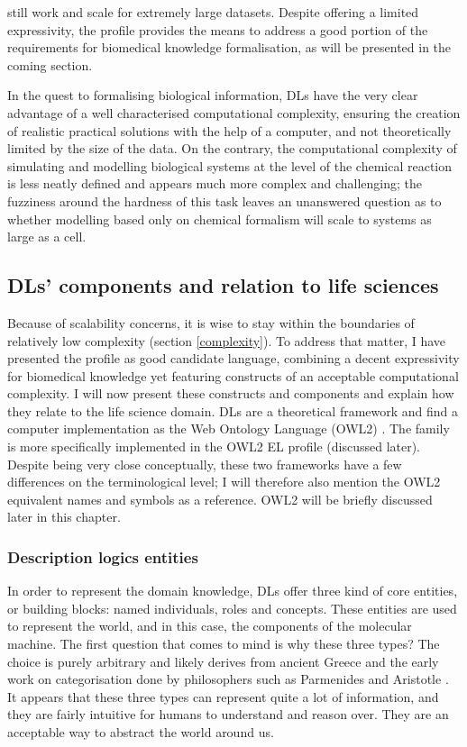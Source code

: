 still work and scale for extremely large datasets. Despite offering a limited expressivity, the  profile provides the means to address a good portion of the requirements for biomedical knowledge formalisation, as will be presented in the coming section.

In the quest to formalising biological information, DLs have the very clear advantage of a well characterised computational complexity, ensuring the creation of realistic practical solutions with the help of a computer, and not theoretically limited by the size of the data. On the contrary, the computational complexity of simulating and modelling biological systems at the level of the chemical reaction is less neatly defined \citep{meng2004modeling} \citep{gillespie2007stochastic} and appears much more complex and challenging; the fuzziness around the hardness of this task leaves an unanswered question as to whether modelling based only on chemical formalism will scale to systems as large as a cell.

\subsection{DLs' components and relation to life sciences}

Because of scalability concerns, it is wise to stay within the boundaries of relatively low complexity (section \ref{complexity}). To address that matter, I have presented the  profile as good candidate language, combining a decent expressivity for biomedical knowledge yet featuring constructs of an acceptable computational complexity. I will now present these constructs and components and explain how they relate to the life science domain. DLs are a theoretical framework and find a computer implementation as the Web Ontology Language (OWL2) \citep{owlw3c}. The  family is more specifically implemented in the OWL2 EL profile (discussed later).
Despite being very close conceptually, these two frameworks have a few differences on the terminological level; I will therefore also mention the OWL2 equivalent names and symbols as a reference. OWL2 will be briefly discussed later in this chapter.

\subsubsection{Description logics entities}
\label{coredl}

In order to represent the domain knowledge, DLs offer three kind of core entities, or building blocks: named individuals, roles and concepts. These entities are used to represent the world, and in this case, the components of the molecular machine. The first question that comes to mind is why these three types? The choice is purely arbitrary and likely derives from ancient Greece and the early work on categorisation done by philosophers such as Parmenides and Aristotle \citep{ontologywiki}. It appears that these three types can represent quite a lot of information, and they are fairly intuitive for humans to understand and reason over. They are an acceptable way to abstract the world around us.

